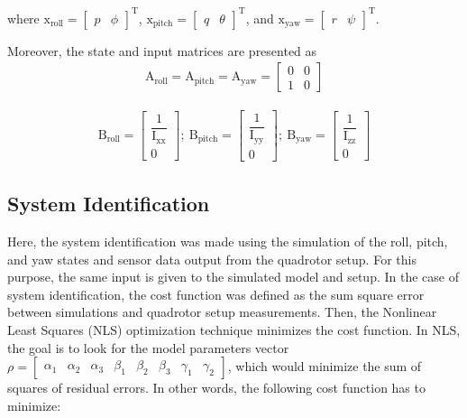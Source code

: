 \documentclass[3p,times]{elsarticle}
\begin{document}
where $\boldsymbol{\mathrm{x}}_{\text{roll}} = \begin{bmatrix}
	p & \phi
\end{bmatrix}^\mathrm{T}$, $\boldsymbol{\mathrm{x}}_{\text{pitch}} = \begin{bmatrix}
	q & \theta \end{bmatrix}^\mathrm{T}$, and $\boldsymbol{\mathrm{x}}_{\text{yaw}} = \begin{bmatrix}
	r & \psi
\end{bmatrix}^\mathrm{T}$.



Moreover, the state and input matrices are presented as
\begin{equation}
	\begin{split}
		\boldsymbol{\mathrm{A}}_{\text{roll}}  =\boldsymbol{\mathrm{A}}_{\text{pitch}}  = \boldsymbol{\mathrm{A}}_{\text{yaw}}  = \begin{bmatrix}
			0 & 0\\
			1 & 0
		\end{bmatrix}
	\end{split}
\end{equation}

\begin{equation}
	\begin{split}
		\boldsymbol{\mathrm{B}}_{\text{roll}}  = \begin{bmatrix}
			\dfrac{1}{\mathrm{I}_{\text{xx}}}
			\\[1em]
			0
		\end{bmatrix};~ \boldsymbol{\mathrm{B}}_{\text{pitch}}  = \begin{bmatrix}
			\dfrac{1}{\mathrm{I}_{\text{yy}}}
			\\[1em]
			0
		\end{bmatrix};~ \boldsymbol{\mathrm{B}}_{\text{yaw}}  = \begin{bmatrix}
			\dfrac{1}{\mathrm{I}_{\text{zz}}}
			\\[1em]
			0
		\end{bmatrix}
	\end{split}
\end{equation}

\subsection{System Identification}

Here, the system identification was made using the simulation of the roll, pitch, and yaw states and sensor data output from the quadrotor setup. For this purpose, the same input is given to the simulated model and setup. In the case of system identification, the cost function was defined as the sum square error between simulations and quadrotor setup measurements. Then, the Nonlinear Least Squares (NLS)  optimization technique minimizes the cost function. In NLS, the goal is to look for the model parameters vector $
\rho = \begin{bmatrix}
    \alpha_1 & \alpha_2 & \alpha_3 & \beta_1 & \beta_2 & \beta_3 & \gamma_1 & \gamma_2
\end{bmatrix}
$, which would minimize the sum of squares of residual errors. In other words, the following cost function has to minimize:
\end{document}
